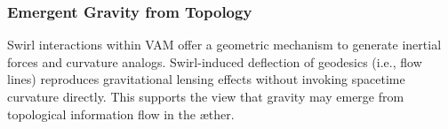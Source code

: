 \subsubsection*{Emergent Gravity from Topology}

Swirl interactions within VAM offer a geometric mechanism to generate inertial forces and curvature analogs. Swirl-induced deflection of geodesics (i.e., flow lines) reproduces gravitational lensing effects without invoking spacetime curvature directly. This supports the view that gravity may emerge from topological information flow in the æther.

